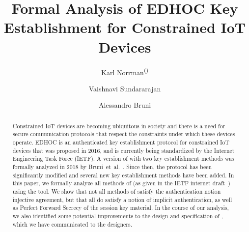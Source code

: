 \documentclass[runningheads, envcountsame, hidelinks, a4paper, draft, x11names]{llncs}
\begin{document}
\title{Formal Analysis of EDHOC Key Establishment for Constrained IoT Devices}
\author{Karl Norrman\textsuperscript{(\Letter)}
\and
    Vaishnavi Sundararajan
\and
    Alessandro Bruni
}

%
%
\authorrunning{}
%
%
\maketitle
%

\begin{abstract}
Constrained IoT devices are becoming ubiquitous in society
and there is a need for secure communication protocols that respect the
constraints under which these devices operate.
%
EDHOC is an authenticated key establishment protocol for constrained IoT
devices that was proposed in 2016, and is currently being standardized by the
Internet Engineering Task Force (IETF).
%
A version of \mEdhoc{} with two key establishment methods was formally analyzed
in 2018 by Bruni~et~al.~\cite{DBLP:conf/secsr/BruniJPS18}.
%
Since then, the protocol has been significantly modified and several new key
establishment methods have been added.
%
In this paper, we formally analyze all methods of \mEdhoc{} (as given in
the IETF internet draft~\cite{our-analysis-selander-lake-edhoc-00}) using the
\mTamarin{} tool.
%
We show that not all methods of \mEdhoc{} satisfy the authentication notion
injective agreement, but that all do satisfy a notion of implicit
authentication, as well as Perfect Forward Secrecy of the session key material.
%
In the course of our analysis, we also identified some potential improvements to the
design and specification of \mEdhoc, which we have communicated to
the designers.
%
\end{abstract}
%

\end{document}
